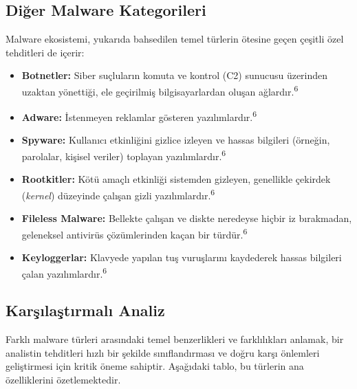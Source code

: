 \subsection{Diğer Malware Kategorileri}

Malware ekosistemi, yukarıda bahsedilen temel türlerin ötesine geçen çeşitli özel tehditleri de içerir:

\begin{itemize}
    \item \textbf{Botnetler:} Siber suçluların komuta ve kontrol (C2) sunucusu üzerinden uzaktan yönettiği, ele geçirilmiş bilgisayarlardan oluşan ağlardır.\textsuperscript{6}
    \item \textbf{Adware:} İstenmeyen reklamlar gösteren yazılımlardır.\textsuperscript{6}
    \item \textbf{Spyware:} Kullanıcı etkinliğini gizlice izleyen ve hassas bilgileri (örneğin, parolalar, kişisel veriler) toplayan yazılımlardır.\textsuperscript{6}
    \item \textbf{Rootkitler:} Kötü amaçlı etkinliği sistemden gizleyen, genellikle çekirdek (\textit{kernel}) düzeyinde çalışan gizli yazılımlardır.\textsuperscript{6}
    \item \textbf{Fileless Malware:} Bellekte çalışan ve diskte neredeyse hiçbir iz bırakmadan, geleneksel antivirüs çözümlerinden kaçan bir türdür.\textsuperscript{6}
    \item \textbf{Keyloggerlar:} Klavyede yapılan tuş vuruşlarını kaydederek hassas bilgileri çalan yazılımlardır.\textsuperscript{6}
\end{itemize}

\subsection{Karşılaştırmalı Analiz}

Farklı malware türleri arasındaki temel benzerlikleri ve farklılıkları anlamak, bir analistin tehditleri hızlı bir şekilde sınıflandırması ve doğru karşı önlemleri geliştirmesi için kritik öneme sahiptir. Aşağıdaki tablo, bu türlerin ana özelliklerini özetlemektedir.

